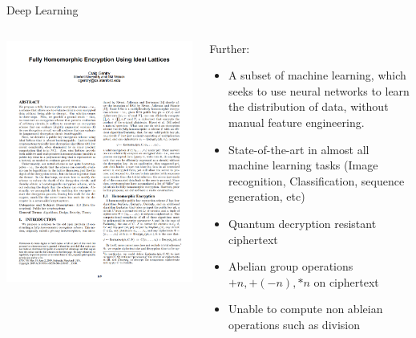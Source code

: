 \documentclass[aspectratio=169]{beamer}
\begin{document}
    \begin{frame}{Deep Learning}
      \begin{columns}
        \begin{column}{0.5\textwidth}
          \includegraphics[width=0.8\linewidth]{gentry.png}
        \end{column}
        \begin{column}{0.5\textwidth}
          Further:\\[.2cm]
          \begin{itemize}
            \item A subset of machine learning, which seeks to use neural networks to learn the distribution of data, without manual feature engineering.
            \item State-of-the-art in almost all machine learning tasks (Image recognition, Classification, sequence generation, etc)
            \item Quantum decryption resistant ciphertext
            \item Abelian group operations ${+n,+(-n),*n}$ on ciphertext
            \item Unable to compute non ableian operations such as division
          \end{itemize}
        \end{column}
      \end{columns}
    \end{frame}
\end{document}

